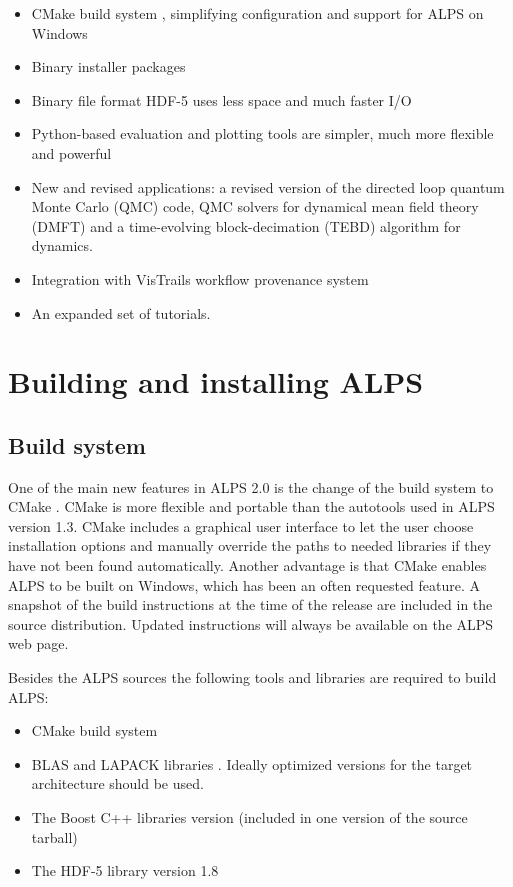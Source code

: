 \documentclass[12pt]{iopart}
\begin{document}
 \begin{itemize}
\item CMake build system \cite{cmake}, simplifying configuration and support for ALPS on  Windows
\item Binary installer packages
\item Binary file format HDF-5 \cite{hdf5} uses less space and much faster I/O
\item Python-based evaluation and plotting tools are simpler, much more flexible and powerful
\item New and revised applications: a revised version of the directed loop quantum Monte Carlo (QMC) code, QMC solvers for dynamical mean field theory (DMFT) and a time-evolving block-decimation (TEBD) algorithm for dynamics.
\item Integration with VisTrails workflow provenance system \cite{vistrails}
\item An expanded set of tutorials.
 \end{itemize}
 
 
\section{Building and installing ALPS}
\subsection{Build system}
One of the main new features in ALPS 2.0 is the change of the build system to CMake \cite{cmake}. CMake is more flexible and portable than the autotools used in ALPS version 1.3. CMake includes a graphical user interface to let the user choose installation options and manually override the paths to needed libraries if they have not been found automatically. Another advantage is that CMake enables ALPS to be built on Windows, which has been an often requested feature. A snapshot of the build instructions at the time of the release are included in the source distribution. Updated instructions will always be available on the ALPS web page.

Besides the ALPS sources the following tools and libraries are required to build ALPS:

\begin{itemize}
\item CMake build system \cite{cmake}
\item BLAS \cite{blasnetlib} and LAPACK libraries \cite{lapack}. Ideally optimized versions for the target architecture should be used.
\item The Boost C++ libraries version (included in one version of the source tarball) \cite{boost}
\item The HDF-5 library version 1.8 \cite{hdf5}
\end{itemize}
\end{document}
